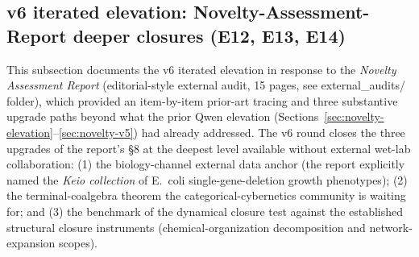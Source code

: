 \documentclass[11pt,a4paper]{article}
\theoremstyle{plain}
\theoremstyle{definition}
\theoremstyle{remark}
\begin{document}
\subsection{v6 iterated elevation: Novelty-Assessment-Report deeper
closures (E12, E13, E14)}
\label{sec:novelty-v6}

This subsection documents the v6 iterated elevation in response to the
\emph{Novelty Assessment Report} (editorial-style external audit, 15
pages, see external\_audits/ folder), which provided an item-by-item
prior-art tracing and three substantive upgrade paths beyond what the
prior Qwen elevation (Sections~\ref{sec:novelty-elevation}--\ref{sec:novelty-v5})
had already addressed. The v6 round closes the three upgrades of the
report's \S 8 at the deepest level available without external wet-lab
collaboration: (1) the biology-channel external data anchor (the
report explicitly named the \emph{Keio collection} of E.~coli
single-gene-deletion growth phenotypes); (2) the terminal-coalgebra
theorem the categorical-cybernetics community is waiting for; and (3)
the benchmark of the dynamical closure test against the established
structural closure instruments (chemical-organization decomposition
and network-expansion scopes).
\end{document}
